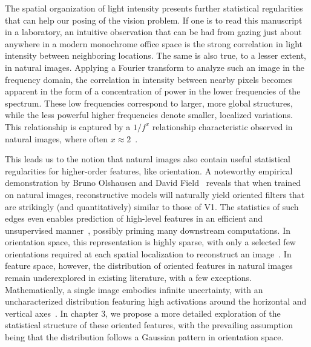 The spatial organization of light intensity presents further statistical regularities that can help our posing of the vision problem. If one is to read this manuscript in a laboratory, an intuitive observation that can be had from gazing just about anywhere in a modern monochrome office space is the strong correlation in light intensity between neighboring locations. The same is also true, to a lesser extent, in natural images. Applying a Fourier transform to analyze such an image in the frequency domain, the correlation in intensity between nearby pixels becomes apparent in the form of a concentration of power in the lower frequencies of the spectrum. These low frequencies correspond to larger, more global structures, while the less powerful higher frequencies denote smaller, localized variations. This relationship is captured by a $1/f^x$ relationship characteristic observed in natural images, where often $x \approx 2$~\cite{tolhurst1992amplitude}.

This leads us to the notion that natural images also contain useful statistical regularities for higher-order features, like orientation. A noteworthy empirical demonstration by Bruno Olshausen and David Field~\cite{olshausen1997sparse, olshausen1996emergence} reveals that when trained on natural images, reconstructive models will naturally yield oriented filters that are strikingly (and quantitatively) similar to those of \gls{V1}. The statistics of such edges even enables prediction of high-level features in an efficient and unsupervised manner~\cite{perrinet2015edge}, possibly priming many downstream computations.
In orientation space, this representation is highly sparse, with only a selected few orientations required at each spatial localization to reconstruct an image~\cite{field1987relations}. In feature space, however, the distribution of oriented features in natural images remain underexplored in existing literature, with a few exceptions. Mathematically, a single image embodies infinite uncertainty, with an uncharacterized distribution featuring high activations around the horizontal and vertical axes~\cite{hansen2004horizontal}. In chapter 3, we propose a more detailed exploration of the statistical structure of these oriented features, with the prevailing assumption being that the distribution follows a Gaussian pattern in orientation space.

